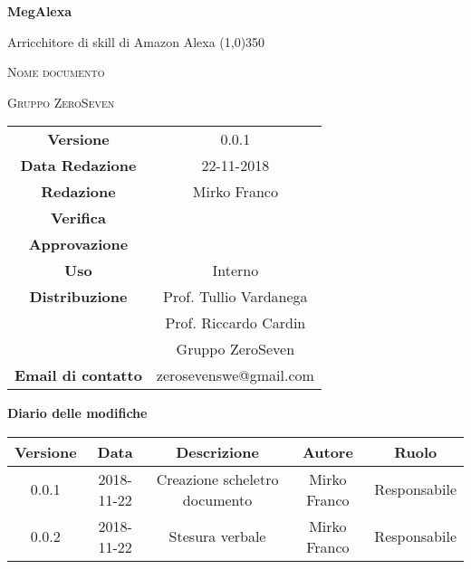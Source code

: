 \documentclass[a4paper,12pt]{article}
\author{Mirko Franco}
\date{26-11-2018}
\begin{document}
\begin{titlepage}
	\centering
	{\huge\bfseries MegAlexa\par}
	Arricchitore di skill di Amazon Alexa
	\line(1,0){350} \\
	{\scshape\LARGE Nome documento \par}
	\vspace{1cm}
	{\scshape Gruppo ZeroSeven \par}
	\logo
	\begin{tabular}{c|c}
		{\hfill \textbf{Versione}} 			& 0.0.1				\\
		{\hfill\textbf{Data Redazione}} 	& 22-11-2018		\\ 
		{\hfill\textbf{Redazione}} 			&  		Mirko Franco			\\ 
		{\hfill\textbf{Verifica}} 				&  				\\ 
		{\hfill\textbf{Approvazione}} 		&  			\\ 
		{\hfill\textbf{Uso}} 					& 	Interno	\\ 
		{\hfill\textbf{Distribuzione}} 			& 			Prof. Tullio Vardanega \\ & Prof. Riccardo Cardin \\ & Gruppo ZeroSeven		\\ 
		{\hfill\textbf{Email di contatto}} & zerosevenswe@gmail.com \\
	\end{tabular}
\end{titlepage}
	

	
	\label{LastFrontPage}
	

	\newpage
	\cleardoublepage
	\begin{center}
		\textbf{Diario delle modifiche}
	\end{center}
	\begin{center}
		\begin{tabular}{|c|c|c|c|c|}
			\hline
			\textbf{Versione} & \textbf{Data} & \textbf{Descrizione} & \textbf{Autore} & \textbf{Ruolo} \\
			\hline
			0.0.1 & 2018-11-22 & Creazione scheletro documento & Mirko Franco & Responsabile\\
			\hline
			0.0.2 & 2018-11-22 & Stesura verbale & Mirko Franco & Responsabile \\
			\hline
		\end{tabular}
	\end{center}
	
	\cleardoublepage
	\pagestyle{mymain}
	
\end{document}
